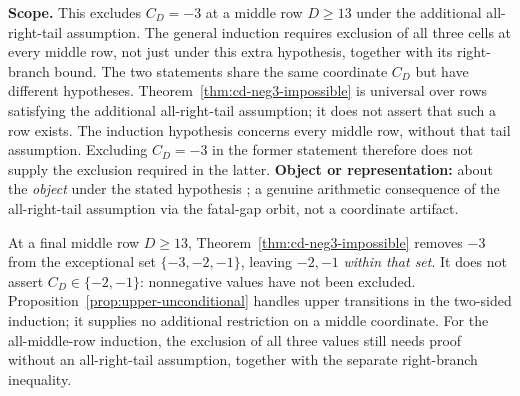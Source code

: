 \begin{thm}[$C_D=-3$ is impossible at the final middle transition, $D\ge 13$]
\textbf{Scope.} This excludes $C_D=-3$ at a middle row $D\ge13$
under the additional all-right-tail assumption.  The general induction
requires exclusion of all three cells at every middle row, not just
under this extra hypothesis, together with its right-branch bound. The two statements share the same coordinate $C_D$
but have different hypotheses.  Theorem~\ref{thm:cd-neg3-impossible}
is universal over rows satisfying the additional all-right-tail
assumption; it does not assert that such a row exists.  The induction
hypothesis concerns every middle row, without that tail assumption.
Excluding $C_D=-3$ in the former statement therefore does not supply
the exclusion required in the latter.
\textbf{Object or representation:} about the \emph{object}
under the stated hypothesis ;  a genuine arithmetic consequence of the all-right-tail assumption
via the fatal-gap orbit, not a coordinate artifact.
\end{thm}

\begin{cor}
\label{cor:cd-remaining}
At a final middle row $D\ge13$, Theorem~\ref{thm:cd-neg3-impossible}
removes $-3$ from the exceptional set $\{-3,-2,-1\}$, leaving
$-2,-1$ \emph{within that set}.  It does not assert
$C_D\in\{-2,-1\}$: nonnegative values have not been excluded.
Proposition~\ref{prop:upper-unconditional} handles upper transitions
in the two-sided induction; it supplies no additional restriction on
a middle coordinate.  For the all-middle-row induction, the exclusion
of all three values still needs proof without an all-right-tail
assumption, together with the separate right-branch inequality.
\end{cor}

